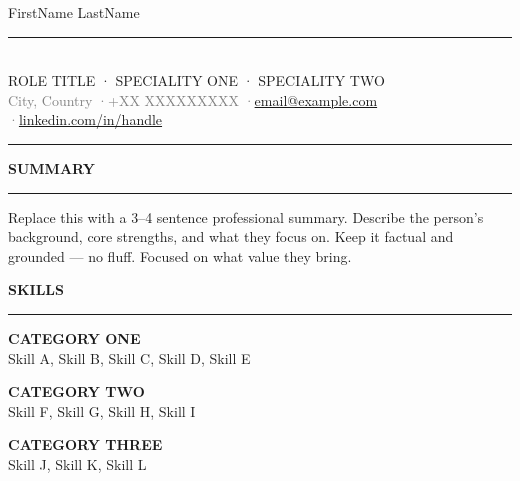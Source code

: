 \documentclass[10pt, a4paper]{article}
\newcommand{\cvsection}[1]{%
  \vspace{0pt}%
  {\fontsize{9}{10}\selectfont\bfseries
    \textcolor{accent}{\MakeUppercase{#1}}}\\[-2pt]%
  \textcolor{accent}{\rule{24pt}{1.5pt}}%
  \vspace{2pt}%
}
\newcommand{\sklabel}[1]{%
  {\fontsize{8.5}{9}\selectfont\bfseries\textcolor{accentlt}%
    {\MakeUppercase{#1}}}%
}
\begin{document}

\begin{center}
{\namefont\fontsize{25}{27}\selectfont FirstName LastName}\\[3pt]
\textcolor{accent}{\rule{0.24\textwidth}{0.8pt}}\\[3pt]
{\fontsize{8}{8.5}\selectfont\textcolor{accent}%
  {ROLE TITLE · SPECIALITY ONE · SPECIALITY TWO}}\\[3pt]
{\fontsize{9}{10}\selectfont\textcolor{graytext}{%
  City, Country
  \enspace·\enspace +XX XXXXXXXXX
  \enspace·\enspace \href{mailto:email@example.com}{email@example.com}
  \enspace·\enspace \href{https://linkedin.com/in/handle}{linkedin.com/in/handle}}}
\end{center}
\vspace{0pt}
{\color{ruleclr}\hrule}
\vspace{2pt}

\cvsection{Summary}
{\fontsize{9}{11.5}\selectfont
Replace this with a 3--4 sentence professional summary. Describe the
person's background, core strengths, and what they focus on. Keep it
factual and grounded --- no fluff. Focused on what value they bring.}

\vspace{1pt}

\cvsection{Skills}


\sklabel{Category One}\\
{\fontsize{9}{11}\selectfont
Skill A, Skill B, Skill C, Skill D, Skill E}

\vspace{1pt}
\sklabel{Category Two}\\
{\fontsize{9}{11}\selectfont
Skill F, Skill G, Skill H, Skill I}

\vspace{1pt}
\sklabel{Category Three}\\
{\fontsize{9}{11}\selectfont
Skill J, Skill K, Skill L}
\end{document}
